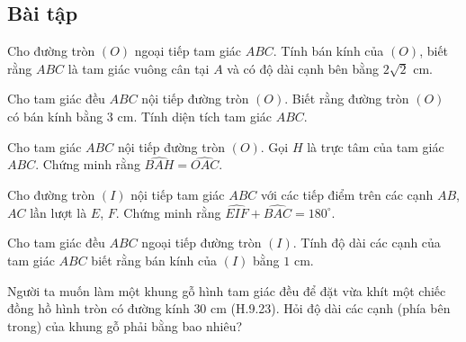 \begin{exercises}
    \subsection{Bài tập}

    \begin{questions}[resume=SGK]
        \item Cho đường tròn $(O)$ ngoại tiếp tam giác $ABC$. Tính bán kính của $(O)$, biết rằng $ABC$ là tam giác vuông cân tại $A$ và có độ dài cạnh bên bằng $2\sqrt2$ cm.

        \answerline
        \answerline

        \item Cho tam giác đều $ABC$ nội tiếp đường tròn $(O)$. Biết rằng đường tròn $(O)$ có bán kính bằng $3$ cm. Tính diện tích tam giác $ABC$.

        \answerline
        \answerline

        \item Cho tam giác $ABC$ nội tiếp đường tròn $(O)$. Gọi $H$ là trực tâm của tam giác $ABC$. Chứng minh rằng $\widehat{BAH}=\widehat{OAC}$.

        \answerline
        \answerline
        \answerline

        \item Cho đường tròn $(I)$ nội tiếp tam giác $ABC$ với các tiếp điểm trên các cạnh $AB$, $AC$ lần lượt là $E$, $F$. Chứng minh rằng $\widehat{EIF}+\widehat{BAC}=180^\circ$.

        \answerline
        \answerline
        \answerline

        \item Cho tam giác đều $ABC$ ngoại tiếp đường tròn $(I)$. Tính độ dài các cạnh của tam giác $ABC$ biết rằng bán kính của $(I)$ bằng $1$ cm.

        \answerline
        \answerline

        \item Người ta muốn làm một khung gỗ hình tam giác đều để đặt vừa khít một chiếc đồng hồ hình tròn có đường kính $30$ cm (H.9.23). Hỏi độ dài các cạnh (phía bên trong) của khung gỗ phải bằng bao nhiêu?


        \answerline
        \answerline
    \end{questions}
\end{exercises}

